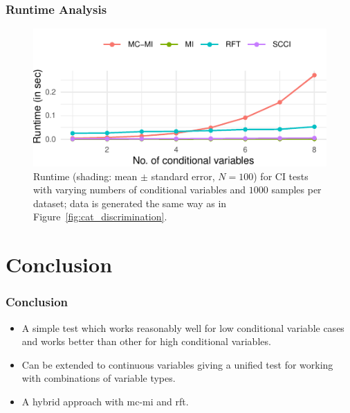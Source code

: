 \documentclass{beamer}
\begin{document}
\begin{frame}
	\frametitle{Runtime Analysis}
	\begin{figure}
		\centering
		\includegraphics{imgs/runtime.pdf}
		\caption{Runtime (shading: mean $\pm$ standard error, $N=100$)
		for CI tests with varying numbers of conditional variables and
		$1000$ samples per dataset; data is generated the same way as
		in Figure~\ref{fig:cat_discrimination}.}
	\end{figure}
\end{frame}

\section{Conclusion}
\begin{frame}
	\frametitle{Conclusion}
	\begin{itemize}
		\item A simple test which works reasonably well for low
			conditional variable cases and works better than other
			for high conditional variables.
		\item Can be extended to continuous variables giving a unified
			test for working with combinations of variable types.
		\item A hybrid approach with mc-mi and rft.
	\end{itemize}
\end{frame}

\end{document}
